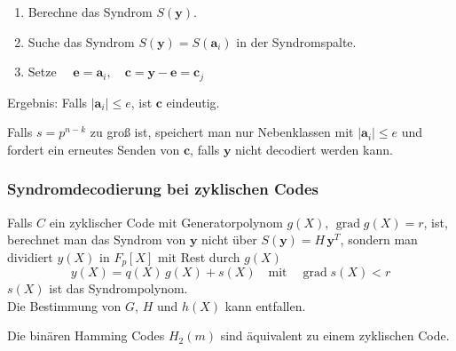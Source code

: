 \begin{algorithmus}[Syndromdecodierung]
\begin{enumerate}[label=\arabic*. Schritt:, leftmargin=*]
  \item Berechne das Syndrom $S(\mathbf{y})$.
  \item Suche das Syndrom $S(\mathbf{y}) = S(\mathbf{a}_i)$ in der Syndromspalte.
  \item Setze $\quad \mathbf{e} = \mathbf{a}_i,\quad \mathbf{c} = \mathbf{y} - \mathbf{e} = \mathbf{c}_j$
\end{enumerate}
Ergebnis: Falls $|\mathbf{a}_i| \le e$, ist $\mathbf{c}$ eindeutig.
\end{algorithmus}

\begin{bemerkung}
Falls $s = p^{n-k}$ zu groß ist, speichert man nur Nebenklassen mit $|\mathbf{a}_i| \le e$ und fordert ein erneutes Senden von $\mathbf{c}$, falls $\mathbf{y}$ nicht decodiert werden kann.
\end{bemerkung}

\subsubsection*{Syndromdecodierung bei zyklischen Codes}

\begin{bemerkung}
Falls $C$ ein zyklischer Code mit Generatorpolynom $g(X)$, $\operatorname{grad} g(X) = r$, ist,
berechnet man das Syndrom von $\mathbf{y}$ nicht über $S(\mathbf{y}) = H\,\mathbf{y}^T$,
sondern man dividiert $y(X)$ in $F_p[X]$ mit Rest durch $g(X)$
\[
  y(X) = q(X)\,g(X) + s(X) \quad\text{mit}\quad \operatorname{grad} s(X) < r
\]
$s(X)$ ist das Syndrompolynom.\\
Die Bestimmung von $G$, $H$ und $h(X)$ kann entfallen.

Die binären Hamming Codes $H_2(m)$ sind äquivalent zu einem zyklischen Code.
\end{bemerkung}

